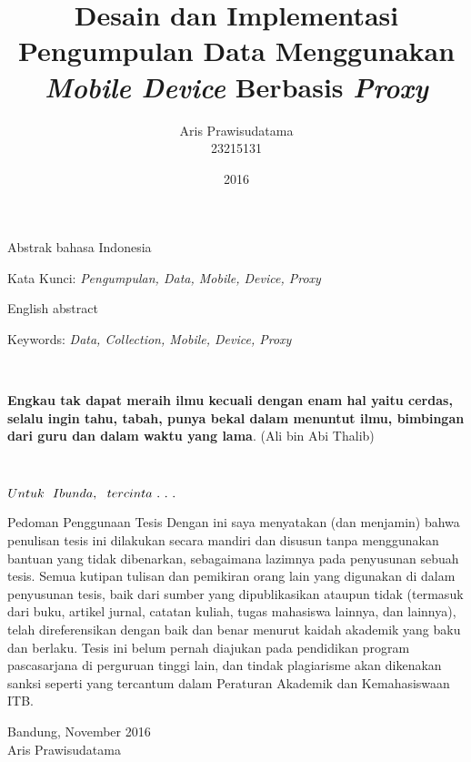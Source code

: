 \documentclass[12pt,a4paper,oneside]{book}
\title{Desain dan Implementasi Pengumpulan Data Menggunakan \textit{Mobile Device} Berbasis \textit{Proxy}}
\author{Aris Prawisudatama\\23215131}
\date{2016}
\numberwithin{equation}{chapter}
\begin{document}
\frontmatter
{}
\makecustompengesahan

\begin{abstrak}[indo]
Abstrak bahasa Indonesia

Kata Kunci: \textit{Pengumpulan, Data, Mobile, Device, Proxy}

\end{abstrak}
\begin{abstrak}[english]
English abstract
  
Keywords: \textit{Data, Collection, Mobile, Device, Proxy}
\end{abstrak}

\
\vspace{5cm}

\begin{center}
\textbf{Engkau tak dapat meraih ilmu kecuali dengan enam hal yaitu cerdas, selalu ingin tahu, tabah, punya bekal dalam menuntut ilmu, bimbingan dari guru dan dalam waktu yang lama}.
(Ali bin Abi Thalib)
\end{center}

\
\vspace{9cm}

\begin{flushright}
\textbf{\large{$\mathnormal{Untuk \  \ Ibunda, \ \ tercinta \ . \ . \ .}$}}
\end{flushright}


    
\begin{custompage}{Pedoman Penggunaan Tesis}
Dengan ini saya menyatakan (dan menjamin) bahwa penulisan tesis ini dilakukan secara mandiri dan disusun tanpa menggunakan bantuan yang tidak dibenarkan, sebagaimana lazimnya pada penyusunan sebuah tesis. Semua kutipan tulisan dan pemikiran orang lain yang digunakan di dalam penyusunan tesis, baik dari sumber yang dipublikasikan ataupun tidak (termasuk dari buku, artikel jurnal, catatan kuliah, tugas mahasiswa lainnya, dan lainnya), telah direferensikan dengan baik dan benar menurut kaidah akademik yang baku dan berlaku. Tesis ini belum pernah diajukan pada pendidikan program pascasarjana di perguruan tinggi lain, dan tindak plagiarisme akan dikenakan sanksi seperti yang tercantum dalam Peraturan Akademik dan Kemahasiswaan ITB.

\begin{flushright}
Bandung, November 2016\\[2cm]
Aris Prawisudatama
\end{flushright} 
\end{custompage}
\end{document}
